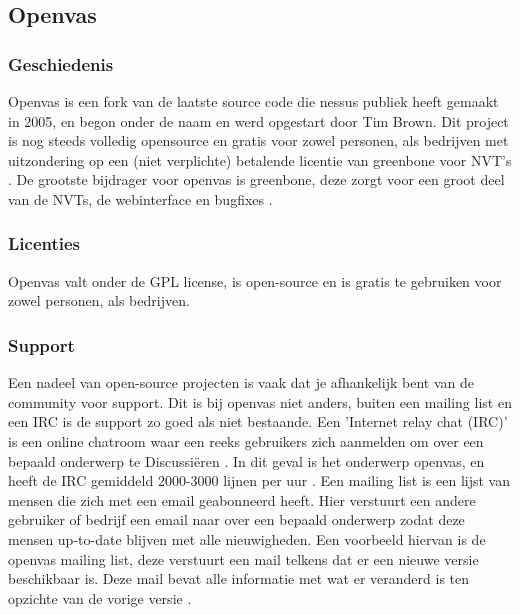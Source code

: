 \subsection{Openvas}

\subsubsection{Geschiedenis}
Openvas is een fork van de laatste source code die nessus publiek heeft gemaakt in 2005, en begon onder de naam \textcite{Securiteam} en werd opgestart door Tim Brown. Dit project is nog steeds volledig opensource \textcite{Openvas-source} en gratis voor zowel personen, als bedrijven met uitzondering op een (niet verplichte) betalende licentie van greenbone voor NVT's \textcite{Openvas-nvt}. De grootste bijdrager voor openvas is greenbone, deze zorgt voor een groot deel van de NVTs, de webinterface en bugfixes \textcite{Openvas-contributors}.

\subsubsection{Licenties}

Openvas valt onder de GPL license, is open-source en is gratis te gebruiken voor zowel personen, als bedrijven.

\subsubsection{Support}

Een nadeel van open-source projecten is vaak dat je afhankelijk bent van de community voor support. Dit is bij openvas niet anders, buiten een mailing list en een IRC is de support zo goed als niet bestaande. 
Een 'Internet relay chat (IRC)' is een online chatroom waar een reeks gebruikers zich aanmelden om over een bepaald onderwerp te Discussiëren \textcite{IRC}. In dit geval is het onderwerp openvas, en heeft de IRC gemiddeld 2000-3000 lijnen per uur \textcite{Openvas-IRC}. Een mailing list is een lijst van mensen die zich met een email geabonneerd heeft. Hier verstuurt een andere gebruiker of bedrijf een email naar over een bepaald onderwerp zodat deze mensen up-to-date blijven met alle nieuwigheden. Een voorbeeld hiervan is de openvas mailing list, deze verstuurt een mail telkens dat er een nieuwe versie beschikbaar is. Deze mail bevat alle informatie met wat er veranderd is ten opzichte van de vorige versie \textcite{techtarget-mailinglist}.

